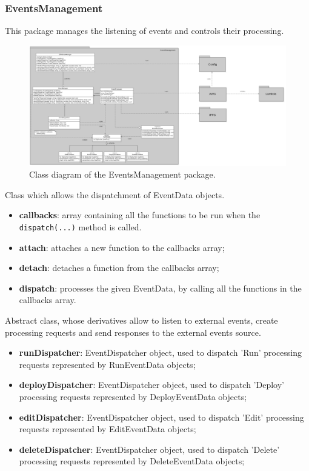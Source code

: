 	\subsubsection{EventsManagement}
	This package manages the listening of events and controls their processing.
	\begin{figure} [h!]
		\centering
		\includegraphics[width=1.1\linewidth]{diagrammi/etherless-server/Eventsmanager}
		\caption{Class diagram of the EventsManagement package.}
	\end{figure}
	Class which allows the dispatchment of EventData objects.
	\begin{itemize}
		\item \textbf{callbacks}: array containing all the functions to be run when the \texttt{dispatch(...)} method is called.
	\end{itemize}
	\begin{itemize}
		\item \textbf{attach}: attaches a new function to the callbacks array;
		\item \textbf{detach}: detaches a function from the callbacks array;
		\item \textbf{dispatch}: processes the given EventData, by calling all the functions in the callbacks array.
	\end{itemize}
	Abstract class, whose derivatives allow to listen to external events, create processing requests and send responses to the external events source.
	\begin{itemize}
		\item \textbf{runDispatcher}: EventDispatcher object, used to dispatch 'Run' processing requests represented by RunEventData objects;
		\item \textbf{deployDispatcher}: EventDispatcher object, used to dispatch 'Deploy' processing requests represented by DeployEventData objects;
		\item \textbf{editDispatcher}: EventDispatcher object, used to dispatch 'Edit' processing requests represented by EditEventData objects;
		\item \textbf{deleteDispatcher}: EventDispatcher object, used to dispatch 'Delete' processing requests represented by DeleteEventData objects;
	\end{itemize}
